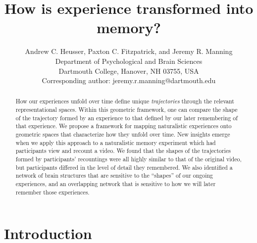 \documentclass{article}
\title{How is experience transformed into memory?}
\author{Andrew C. Heusser, Paxton C. Fitzpatrick, and Jeremy R. Manning\\Department of Psychological and Brain Sciences\\Dartmouth College, Hanover, NH 03755, USA\\Corresponding author: jeremy.r.manning@dartmouth.edu}
\begin{document}
\maketitle

\begin{abstract}
How our experiences unfold over time define unique \textit{trajectories} through the relevant representational spaces.  Within this geometric framework, one can compare the shape of the trajectory formed by an experience to that defined by our later remembering of that experience.  We propose a framework for mapping naturalistic experiences onto geometric spaces that characterize how they unfold over time.  New insights emerge when we apply this approach to a naturalistic memory experiment which had participants view and recount a video.  We found that the shapes of the trajectories formed by participants' recountings were all highly similar to that of the original video, but participants differed in the level of detail they remembered.  We also identified a network of brain structures that are sensitive to the ``shapes'' of our ongoing experiences, and an overlapping network that is sensitive to how we will later remember those experiences.
\end{abstract}


\section*{Introduction}
\end{document}
